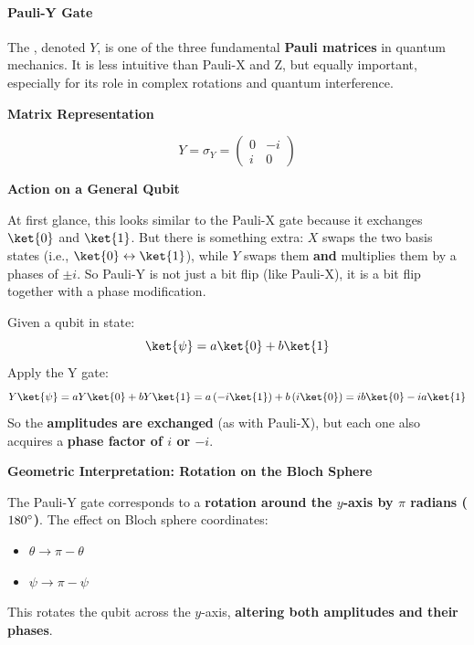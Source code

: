 \paragraph{Pauli-Y Gate}\label{subsubsection: Pauli-Y Gate}

The , denoted $Y$, is one of the three fundamental \textbf{Pauli matrices} in quantum mechanics. It is less intuitive than Pauli-X and Z, but equally important, especially for its role in complex rotations and quantum interference.

\highspace
\begin{flushleft}
    \textcolor{Green3}{ \textbf{Matrix Representation}}
\end{flushleft}
\begin{equation*}
    Y = \sigma_{Y} = \begin{pmatrix}
        0 & -i \\ i & 0
    \end{pmatrix}
\end{equation*}

\highspace
\begin{flushleft}
    \textcolor{Green3}{ \textbf{Action on a General Qubit}}
\end{flushleft}
At first glance, this looks similar to the Pauli-X gate because it exchanges $\ket{0}$ and $\ket{1}$. But there is something extra: $X$ swaps the two basis states (i.e., $\ket{0} \leftrightarrow \ket{1}$), while $Y$ swaps them \textbf{and} multiplies them by a phases of $\pm i$. So Pauli-Y is not just a bit flip (like Pauli-X), it is a bit flip together with a phase modification.

\highspace
Given a qubit in state:
\begin{equation*}
	\ket{\psi} = a\ket{0} + b\ket{1}
\end{equation*}
Apply the Y gate:
\begin{equation*}
	Y\ket{\psi} = aY\ket{0} + bY\ket{1} = a\left(-i \ket{1}\right) + b\left(i \ket{0}\right) = ib\ket{0} - ia\ket{1}
\end{equation*}
So the \textbf{amplitudes are exchanged} (as with Pauli-X), but each one also acquires a \textbf{phase factor of $i$ or $-i$}.

\highspace
\begin{flushleft}
    \textcolor{Green3}{ \textbf{Geometric Interpretation: Rotation on the Bloch Sphere}}
\end{flushleft}
The Pauli-Y gate corresponds to a \textbf{rotation around the $y$-axis by $\pi$ radians ($180 ^\circ$)}. The effect on Bloch sphere coordinates:
\begin{itemize}
    \item $\theta \rightarrow \pi - \theta$
    \item $\psi \rightarrow \pi - \psi$
\end{itemize}
This rotates the qubit across the $y$-axis, \textbf{altering both amplitudes and their phases}.

